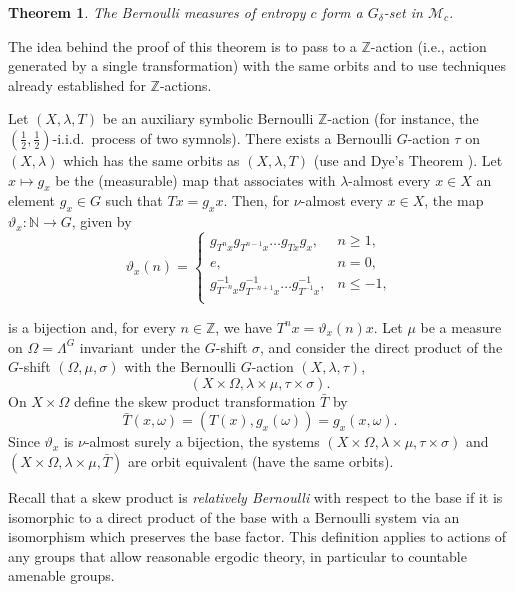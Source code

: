 \documentclass{amsart}
\newtheorem{thm}{Theorem}[section]
\theoremstyle{remark}
\def \N {\mathbb N}
\def \Z {\mathbb Z}
\def \M {\mathcal M}
\def \inv {invariant}
\begin{document}
\begin{thm}\label{T2}
The Bernoulli measures of entropy $c$ form a $G_\delta$-set in $\M_c$. 
\end{thm}

The idea behind the proof of this theorem is to pass to a $\Z$-action (i.e., action generated by a single transformation) with the same orbits and to use techniques already established for $\Z$-actions.

Let $(X,\lambda,T)$ be an auxiliary symbolic Bernoulli $\Z$-action (for instance, the $(\frac12,\frac12)$-i.i.d.\ process of two symnols). There exists a Bernoulli $G$-action $\tau$ on $(X,\lambda)$ which has the same orbits as $(X,\lambda,T)$ (use \cite[Theorem 6]{7a} and Dye's Theorem \cite{4a}). Let $x\mapsto g_x$ be the (measurable) map that associates with $\lambda$-almost every $x\in X$ an element $g_x\in G$ such that $Tx = g_xx$. Then, for $\nu$-almost every $x\in X$, the map $\vartheta_x:\N\to G$, given by
$$
\vartheta_x(n) = 
\begin{cases}
g_{T^nx}g_{T^{n-1}x}\dots g_{Tx}g_x,& n\ge1,\\
e,& n=0,\\
g^{-1}_{T^{-n}x}g^{-1}_{T^{-n+1}x}\dots g^{-1}_{T^{-1}x},& n\le-1,\\
\end{cases}
$$

\smallskip\noindent
is a bijection and, for every $n\in\Z$, we have $T^nx=\vartheta_x(n)x$.
Let $\mu$ be a measure on $\Omega=\Lambda^G$ \inv\ under the $G$-shift $\sigma$, and consider the direct product of the $G$-shift $(\Omega,\mu,\sigma)$ with the Bernoulli $G$-action $(X,\lambda,\tau)$,  
$$
(X\times\Omega,\lambda\times\mu,\tau\times\sigma).
$$ 
On $X\times\Omega$ define the skew product transformation
$\bar T$ by 
\begin{equation}\label{Tbar}
\bar T(x,\omega)=(T(x),g_x(\omega))=g_x(x,\omega).
\end{equation}
Since $\vartheta_x$ is $\nu$-almost surely a bijection, the systems
$(X\times\Omega,\lambda\times\mu,\tau\times\sigma)$ and 
$(X\times\Omega,\lambda\times\mu,\bar T)$ are orbit equivalent (have the same orbits).

Recall that a skew product is \emph{relatively Bernoulli} with respect to the base if it is isomorphic to a direct product of the base with a Bernoulli system via an isomorphism which preserves the base factor. This  definition applies to actions of any groups that allow reasonable ergodic theory, in particular to countable amenable groups.
\end{document}
